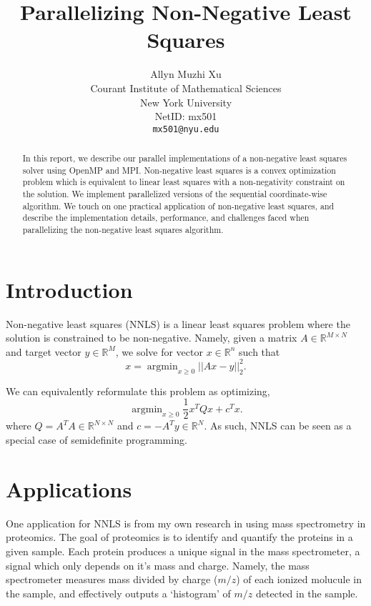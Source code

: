 \documentclass{article}
\title{Parallelizing Non-Negative Least Squares}
\author{Allyn Muzhi Xu \\
	Courant Institute of Mathematical Sciences\\
	New York University\\
	NetID: mx501\\
	\texttt{mx501@nyu.edu} \\
}
\date{}
\DeclareMathOperator*{\argmin}{\text{argmin}}
\begin{document}
\maketitle

\begin{abstract}
	In this report, we describe our parallel implementations of a non-negative least squares solver using OpenMP and MPI. Non-negative least squares is a convex optimization problem which is equivalent to linear least squares with a non-negativity constraint on the solution. We implement parallelized versions of the sequential coordinate-wise algorithm. We touch on one practical application of non-negative least squares, and describe the implementation details, performance, and challenges faced when parallelizing the non-negative least squares algorithm. 
\end{abstract}



\section{Introduction}
Non-negative least squares (NNLS) is a linear least squares problem where the solution is constrained to be non-negative. Namely, given a matrix $A \in \mathbb R^{M \times N}$ and target vector $y \in \mathbb R^M$, we solve for vector $x \in \mathbb R^n$ such that
\begin{equation}\label{eq:nnls}
    x = \argmin_{x \geq 0} || Ax - y ||_2^2.
\end{equation} 

We can equivalently reformulate this problem as optimizing,
\begin{equation} \label{eq:qnnls}
    \argmin_{x \geq 0} \frac{1}{2} x^T Q x + c^T x .
\end{equation}
where $Q = A^T A \in \mathbb R^{N \times N}$ and $c = -A^T y \in \mathbb R^N$. As such, NNLS can be seen as a special case of semidefinite programming.

\section{Applications}
One application for NNLS is from my own research in using mass spectrometry in proteomics. The goal of proteomics is to identify and quantify the proteins in a given sample. Each protein produces a unique signal in the mass spectrometer, a signal which only depends on it's mass and charge. Namely, the mass spectrometer measures mass divided by charge ($m/z$) of each ionized molucule in the sample, and effectively outputs a `histogram' of $m/z$ detected in the sample. 
\end{document}
